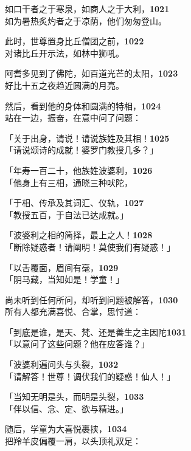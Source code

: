 如口干者之于寒泉，如商人之于大利，\hfill{\grayfootnotesize \textbf{1021}} \\
如为暑热炙灼者之于凉荫，他们匆匆登山。


此时，世尊置身比丘僧团之前，\hfill{\grayfootnotesize \textbf{1022}} \\
对诸比丘开示法，如林中狮吼。

阿耆多见到了佛陀，如百道光芒的太阳，\hfill{\grayfootnotesize \textbf{1023}} \\
好比十五之夜趋近圆满的月亮。

然后，看到他的身体和圆满的特相，\hfill{\grayfootnotesize \textbf{1024}} \\
站在一边，振奋，在意中问了问题：


「关于出身，请说！请说族姓及其相！\hfill{\grayfootnotesize \textbf{1025}} \\
「请说颂诗的成就！婆罗门教授几多？」


「年寿一百二十，他族姓波婆利，\hfill{\grayfootnotesize \textbf{1026}} \\
「他身上有三相，通晓三种吠陀，

「于相、传承及其词汇、仪轨，\hfill{\grayfootnotesize \textbf{1027}} \\
「教授五百，于自法已达成就。」


「波婆利之相的简择，最上之人！\hfill{\grayfootnotesize \textbf{1028}} \\
「断除疑惑者！请阐明！莫使我们有疑惑！」


「以舌覆面，眉间有毫，\hfill{\grayfootnotesize \textbf{1029}} \\
「阴马藏，当知如是！学童！」

尚未听到任何所问，却听到问题被解答，\hfill{\grayfootnotesize \textbf{1030}} \\
所有人都充满喜悦、合掌，思忖道：

「到底是谁，是天、梵、还是善生之主因陀\hfill{\grayfootnotesize \textbf{1031}} \\
「以意问了这些问题？他在应答谁？」


「波婆利遍问头与头裂，\hfill{\grayfootnotesize \textbf{1032}} \\
「请解答！世尊！调伏我们的疑惑！仙人！」


「当知无明是头，而明是头裂，\hfill{\grayfootnotesize \textbf{1033}} \\
「伴以信、念、定、欲与精进。」


随后，学童为大喜悦裹挟，\hfill{\grayfootnotesize \textbf{1034}} \\
把羚羊皮偏覆一肩，以头顶礼双足：


